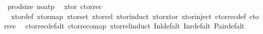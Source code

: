 \begin{isabellebody}
\endisatagML
{\isafoldML}%
%
\isadelimML
\isanewline
%
\endisadelimML
\isanewline
{}\isamarkupfalse%
\ prod{\isachardot}{\kern0pt}size\ {\isacharbrackleft}{\kern0pt}no{\isacharunderscore}{\kern0pt}atp{\isacharbrackright}{\kern0pt}\isanewline
\isanewline
{}\isamarkupfalse%
\ {\isacharparenleft}{\kern0pt}\ xtor\ ctor{\isacharunderscore}{\kern0pt}rec\isanewline
\isanewline
{}\isamarkupfalse%
\ {\isacharparenleft}{\kern0pt}\isanewline
\ \ xtor{\isacharunderscore}{\kern0pt}def\ xtor{\isacharunderscore}{\kern0pt}map\ xtor{\isacharunderscore}{\kern0pt}set\ xtor{\isacharunderscore}{\kern0pt}rel\ xtor{\isacharunderscore}{\kern0pt}induct\ xtor{\isacharunderscore}{\kern0pt}xtor\ xtor{\isacharunderscore}{\kern0pt}inject\ ctor{\isacharunderscore}{\kern0pt}rec{\isacharunderscore}{\kern0pt}def\ ctor{\isacharunderscore}{\kern0pt}rec\isanewline
\ \ ctor{\isacharunderscore}{\kern0pt}rec{\isacharunderscore}{\kern0pt}def{\isacharunderscore}{\kern0pt}alt\ ctor{\isacharunderscore}{\kern0pt}rec{\isacharunderscore}{\kern0pt}o{\isacharunderscore}{\kern0pt}map\ xtor{\isacharunderscore}{\kern0pt}rel{\isacharunderscore}{\kern0pt}induct\ Inl{\isacharunderscore}{\kern0pt}def{\isacharunderscore}{\kern0pt}alt\ Inr{\isacharunderscore}{\kern0pt}def{\isacharunderscore}{\kern0pt}alt\ Pair{\isacharunderscore}{\kern0pt}def{\isacharunderscore}{\kern0pt}alt\isanewline
%
\isadelimtheory
\isanewline
%
\endisadelimtheory
%
\isatagtheory
{}\isamarkupfalse%
%
\endisatagtheory
{\isafoldtheory}%
%
\isadelimtheory
%
\endisadelimtheory
%
\end{isabellebody}%
\endinput
